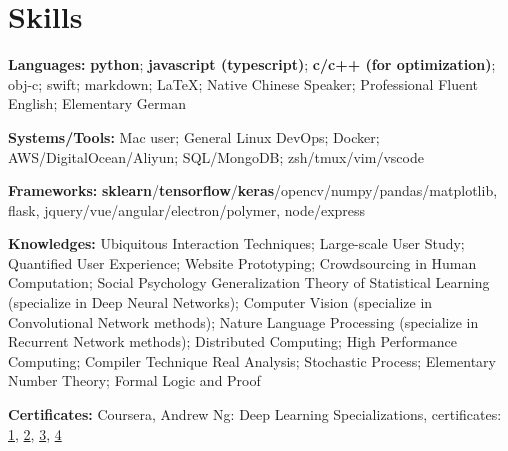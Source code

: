\section{\textbf{Skills}}
\resumeSubHeadingListStart
\item{
  \textbf{Languages:}{ \textbf{python}; \textbf{javascript (typescript)}; \textbf{c/c++ (for optimization)}; obj-c; swift; markdown; \LaTeX; Native Chinese Speaker; Professional Fluent English; Elementary German}
}
\item{
 \textbf{Systems/Tools:}{ Mac user; General Linux DevOps; Docker; AWS/DigitalOcean/Aliyun; SQL/MongoDB; zsh/tmux/vim/vscode}
}
\item{
 \textbf{Frameworks:}{ \textbf{sklearn}/\textbf{tensorflow}/\textbf{keras}/opencv/numpy/pandas/matplotlib, flask, jquery/vue/angular/electron/polymer, node/express}
}
\item{
  \textbf{Knowledges:}{ 
    \resumeItemListStart
       { Ubiquitous Interaction Techniques; Large-scale User Study; Quantified User Experience; Website Prototyping; Crowdsourcing in Human Computation; Social Psychology}
       { Generalization Theory of Statistical Learning (specialize in Deep Neural Networks); Computer Vision (specialize in Convolutional Network methods); Nature Language Processing (specialize in Recurrent Network methods); Distributed Computing; High Performance Computing; Compiler Technique}
       { Real Analysis; Stochastic Process; Elementary Number Theory; Formal Logic and Proof}
   \resumeItemListEnd
  }
}
\item{
 \textbf{Certificates:}{
  Coursera, Andrew Ng: Deep Learning Specializations, certificates:
  \href{https://www.coursera.org/account/accomplishments/verify/YH4NT7HHN263}{1}, 
  \href{https://www.coursera.org/account/accomplishments/verify/QGH3GNGF6BM4}{2}, 
  \href{https://www.coursera.org/account/accomplishments/verify/6VU45R2SZEF6}{3},
  \href{https://www.coursera.org/account/accomplishments/verify/LF3K9BQQDLVL}{4}
 }
}
\resumeSubHeadingListEnd